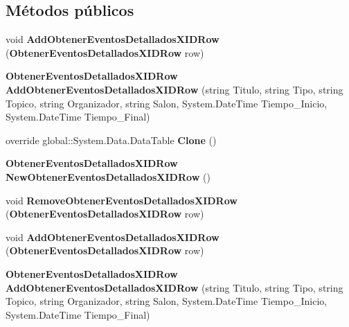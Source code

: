 \subsection*{Métodos públicos}
\begin{DoxyCompactItemize}
\item 
void {\bfseries Add\+Obtener\+Eventos\+Detallados\+X\+I\+D\+Row} ({\bf Obtener\+Eventos\+Detallados\+X\+I\+D\+Row} row)\label{class_resa___pro_1_1_resa_d_b_data_set_1_1_obtener_eventos_detallados_x_i_d_data_table_ab4c99d1c51ef0344b9a1759d24d2c156}

\item 
{\bf Obtener\+Eventos\+Detallados\+X\+I\+D\+Row} {\bfseries Add\+Obtener\+Eventos\+Detallados\+X\+I\+D\+Row} (string Titulo, string Tipo, string Topico, string Organizador, string Salon, System.\+Date\+Time Tiempo\+\_\+\+Inicio, System.\+Date\+Time Tiempo\+\_\+\+Final)\label{class_resa___pro_1_1_resa_d_b_data_set_1_1_obtener_eventos_detallados_x_i_d_data_table_afe2a0cb496ef8f1d0a9107e99ba41686}

\item 
override global\+::\+System.\+Data.\+Data\+Table {\bfseries Clone} ()\label{class_resa___pro_1_1_resa_d_b_data_set_1_1_obtener_eventos_detallados_x_i_d_data_table_a0e88346b627efca7c5f41fcd22423202}

\item 
{\bf Obtener\+Eventos\+Detallados\+X\+I\+D\+Row} {\bfseries New\+Obtener\+Eventos\+Detallados\+X\+I\+D\+Row} ()\label{class_resa___pro_1_1_resa_d_b_data_set_1_1_obtener_eventos_detallados_x_i_d_data_table_a40e78f960eaa2a4d49b729eb63c07aa7}

\item 
void {\bfseries Remove\+Obtener\+Eventos\+Detallados\+X\+I\+D\+Row} ({\bf Obtener\+Eventos\+Detallados\+X\+I\+D\+Row} row)\label{class_resa___pro_1_1_resa_d_b_data_set_1_1_obtener_eventos_detallados_x_i_d_data_table_a0cb3fe6cbf2bbf15b9f4881be08cb83c}

\item 
void {\bfseries Add\+Obtener\+Eventos\+Detallados\+X\+I\+D\+Row} ({\bf Obtener\+Eventos\+Detallados\+X\+I\+D\+Row} row)\label{class_resa___pro_1_1_resa_d_b_data_set_1_1_obtener_eventos_detallados_x_i_d_data_table_ab4c99d1c51ef0344b9a1759d24d2c156}

\item 
{\bf Obtener\+Eventos\+Detallados\+X\+I\+D\+Row} {\bfseries Add\+Obtener\+Eventos\+Detallados\+X\+I\+D\+Row} (string Titulo, string Tipo, string Topico, string Organizador, string Salon, System.\+Date\+Time Tiempo\+\_\+\+Inicio, System.\+Date\+Time Tiempo\+\_\+\+Final)\label{class_resa___pro_1_1_resa_d_b_data_set_1_1_obtener_eventos_detallados_x_i_d_data_table_afe2a0cb496ef8f1d0a9107e99ba41686}


\end{DoxyCompactItemize}
